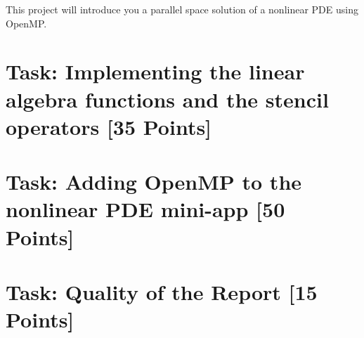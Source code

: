 \documentclass[unicode,11pt,a4paper,oneside,numbers=endperiod,openany]{scrartcl}
\begin{document}
\setassignment
{}

\newline

\assignmentpolicy
This project will introduce you a parallel space solution of a nonlinear PDE using OpenMP.


\section{Task: Implementing the linear algebra functions and the stencil operators [35 Points]}


\section{Task:  Adding OpenMP to the nonlinear PDE mini-app [50 Points]}



\section{Task:  Quality of the Report   [15 Points]}
\end{document}
